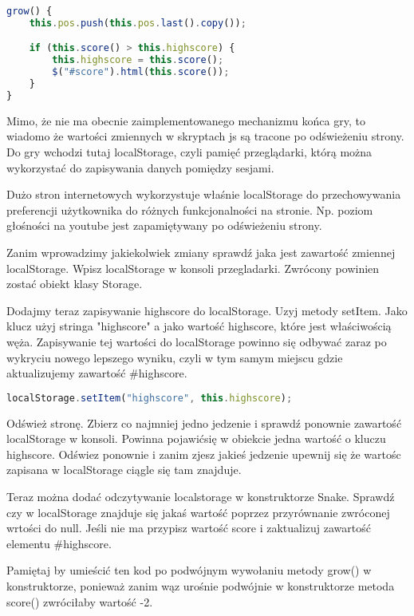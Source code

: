 \documentclass[12pt]{article}
\begin{document}
\begin{lstlisting}[language=JavaScript]
grow() {
    this.pos.push(this.pos.last().copy());

    if (this.score() > this.highscore) {
        this.highscore = this.score();
        $("#score").html(this.score());
    }
}
\end{lstlisting}

Mimo, że nie ma obecnie zaimplementowanego mechanizmu końca gry, to wiadomo że wartości zmiennych w skryptach js są tracone po odświeżeniu strony. Do gry wchodzi tutaj localStorage, czyli pamięć przeglądarki, którą można wykorzystać do zapisywania danych pomiędzy sesjami.

Dużo stron internetowych wykorzystuje właśnie localStorage do przechowywania preferencji użytkownika do różnych funkcjonalności na stronie. Np. poziom głośności na youtube jest zapamiętywany po odświeżeniu strony.

Zanim wprowadzimy jakiekolwiek zmiany sprawdź jaka jest zawartość zmiennej localStorage. Wpisz localStorage w konsoli przegladarki. Zwrócony powinien zostać obiekt klasy Storage.

Dodajmy teraz zapisywanie highscore do localStorage. Uzyj metody setItem. Jako klucz użyj stringa "highscore" a jako wartość highscore, które jest właściwością węża. Zapisywanie tej wartości do localStorage powinno się odbywać zaraz po wykryciu nowego lepszego wyniku, czyli w tym samym miejscu gdzie aktualizujemy zawartość #highscore.

\begin{lstlisting}[language=JavaScript]
localStorage.setItem("highscore", this.highscore);
\end{lstlisting}

Odśwież stronę. Zbierz co najmniej jedno jedzenie i sprawdź ponownie zawartość localStorage w konsoli. Powinna pojawićsię w obiekcie jedna wartość o kluczu highscore. Odświez ponownie i zanim zjesz jakieś jedzenie upewnij się że wartośc zapisana w localStorage ciągle się tam znajduje.

Teraz można dodać odczytywanie localstorage w konstruktorze Snake. Sprawdź czy w localStorage znajduje się jakaś wartość poprzez przyrównanie zwróconej wrtości do null. Jeśli nie ma przypisz wartość score i zaktualizuj zawartość elementu #highscore.

Pamiętaj by umieścić ten kod po podwójnym wywołaniu metody grow() w konstruktorze, ponieważ zanim wąz urośnie podwójnie w konstruktorze metoda score() zwróciłaby wartość -2.
\end{document}
